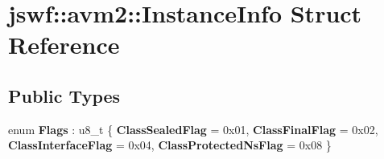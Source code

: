 \hypertarget{structjswf_1_1avm2_1_1_instance_info}{\section{jswf\+:\+:avm2\+:\+:Instance\+Info Struct Reference}
\label{structjswf_1_1avm2_1_1_instance_info}
}
\subsection*{Public Types}
\begin{DoxyCompactItemize}
\item 
\hypertarget{structjswf_1_1avm2_1_1_instance_info_aacb09d330a2785abddd3b9cb8d2b6074}{enum {\bfseries Flags} \+: u8\+\_\+t \{ {\bfseries Class\+Sealed\+Flag} = 0x01, 
{\bfseries Class\+Final\+Flag} = 0x02, 
{\bfseries Class\+Interface\+Flag} = 0x04, 
{\bfseries Class\+Protected\+Ns\+Flag} = 0x08
 \}}\label{structjswf_1_1avm2_1_1_instance_info_aacb09d330a2785abddd3b9cb8d2b6074}

\end{DoxyCompactItemize}
